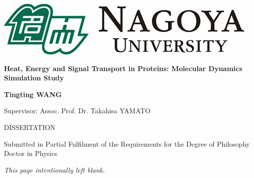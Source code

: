 \documentclass[12pt, oneside]{article}
\begin{document}
\graphicspath{ {figures/titlepage/} }
 
\thispagestyle{empty}
\begin{center}
\begin{minipage}{1\linewidth}
    \centering
    \includegraphics[width=0.6\linewidth]{images.jpeg}\par
    \vspace{1cm}
    {{\Huge \textbf {Heat, Energy and Signal Transport in Proteins: 
    Molecular Dynamics Simulation Study}\par}}
    \vspace{2cm}
    {\Large \textbf {Tingting WANG}\par}
    \vspace{1cm}
    {\Large Supervisor: Assoc. Prof. Dr. Takahisa YAMATO \par}
    \vspace{1.5cm}
    {\Large DISSERTATION \par
    Submitted in Partial Fulfilment of the Requirements 
    for the Degree of 
    Philosophy Doctor in Physics\par}
    \vspace{1.5cm}
    {\Large  \linespread{1.5}{
    Computational Biophysics Laboratory (B-Lab) \par
    Graduate School of Science \par
    September 2023 \par}}
\end{minipage}
\end{center}
\clearpage

\newpage
\begin{center}
\textit{This page intentionally left blank.}
\end{center}
\thispagestyle{empty}\newpage
\end{document}
